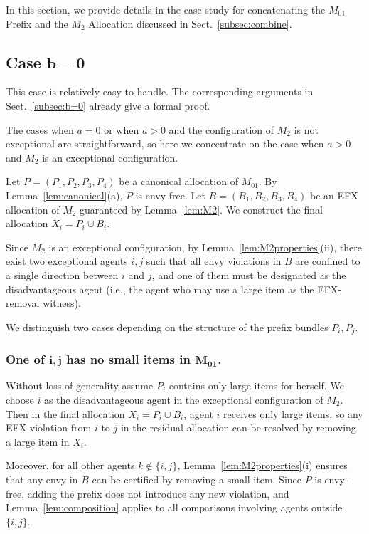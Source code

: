 \documentclass{article}
\theoremstyle{definition}
\begin{document}
In this section, we provide details in the case study for concatenating the $M_{01}$ Prefix and the $M_2$ Allocation discussed in Sect.~\ref{subsec:combine}.

\subsection{Case $\boldsymbol{b=0}$}
This case is relatively easy to handle.
The corresponding arguments in Sect.~\ref{subsec:b=0} already give a formal proof.

\iffalse
The cases when $a=0$ or when $a>0$ and the configuration of $M_2$ is not exceptional are straightforward, so here we concentrate on the case when $a>0$ and $M_2$ is an exceptional configuration.

Let $P=(P_1,P_2,P_3,P_4)$ be a canonical allocation of $M_{01}$. By Lemma~\ref{lem:canonical}(a), $P$ is envy-free.
Let $B=(B_1,B_2,B_3,B_4)$ be an EFX allocation of $M_2$ guaranteed by Lemma~\ref{lem:M2}. We construct the final allocation $X_i=P_i\cup B_i$.

Since $M_2$ is an exceptional configuration, by Lemma~\ref{lem:M2properties}(ii), there exist two exceptional agents $i,j$ such that all envy violations in $B$ are confined to a single direction between $i$ and $j$, and one of them must be designated as the disadvantageous agent (i.e., the agent who may use a large item as the EFX-removal witness).

We distinguish two cases depending on the structure of the prefix bundles $P_i,P_j$.

\subsubsection{One of $\boldsymbol{i,j}$ has no small items in $\boldsymbol{M_{01}}$.}
Without loss of generality assume $P_i$ contains only large items for herself. We choose $i$ as the disadvantageous agent in the exceptional configuration of $M_2$. Then in the final allocation $X_i=P_i\cup B_i$, agent $i$ receives only large items, so any EFX violation from $i$ to $j$ in the residual allocation can be resolved by removing a large item in $X_i$.

Moreover, for all other agents $k\notin\{i,j\}$, Lemma~\ref{lem:M2properties}(i) ensures that any envy in $B$ can be certified by removing a small item. Since $P$ is envy-free, adding the prefix does not introduce any new violation, and Lemma~\ref{lem:composition} applies to all comparisons involving agents outside $\{i,j\}$.
\end{document}

